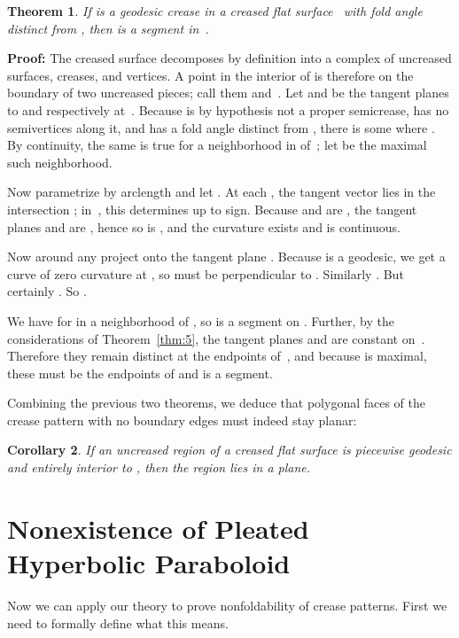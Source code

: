 \documentclass[11pt,letterpaper]{article}
\newtheorem{theorem}{Theorem}
\newtheorem{corollary}[theorem]{Corollary}
\newenvironment{proof}{\noindent\textbf{Proof: }\ignorespaces}
  {\hspace*{\fill}\medskip}
\begin{document}
\begin{theorem} \label{straight creases stay straight}
  If  is a geodesic crease in a creased flat surface~
  with fold angle distinct from ,
  then  is a segment in~.
\end{theorem}
\begin{proof}
  The creased surface  decomposes by definition into a complex of
  uncreased surfaces, creases, and vertices.
  A point  in the interior of  is therefore on the boundary of two
  uncreased pieces; call them  and~.  Let  and  be the tangent
  planes to  and  respectively at~.
  Because  is by hypothesis not a proper semicrease,
  has no semivertices along it,
  and has a fold angle distinct from ,
  there is some  where .
  By continuity, the same is true for a neighborhood in  of~;
  let  be the maximal such neighborhood.

  Now parametrize  by arclength and let .  At
  each , the tangent vector  lies in the
  intersection ; in~, this determines  up
  to sign.  Because  and  are , the tangent planes  and 
  are , hence so is , and the curvature 
  exists and is continuous.

  Now around any  project  onto the tangent plane
  .  Because  is a geodesic, we get a curve of zero
  curvature at , so  must be perpendicular to .
  Similarly .  But certainly .  So .

  We have  for  in a neighborhood of , so
   is a segment on .  Further, by the considerations of
  Theorem~\ref{thm:5}, the tangent planes  and  are constant
  on~.  Therefore they remain distinct at the endpoints of~, and
  because  is maximal, these must be the endpoints of  and
   is a segment.
\end{proof}

Combining the previous two theorems, we deduce that
polygonal faces of the crease pattern with no boundary edges
must indeed stay planar:

\begin{corollary}\label{planar dammit}
  If an uncreased region of a creased flat surface  is piecewise
  geodesic and entirely interior to , then the region lies in a plane.
\end{corollary}




\section{Nonexistence of Pleated Hyperbolic Paraboloid}

Now we can apply our theory to prove nonfoldability of crease patterns.
First we need to formally define what this means.
\end{document}
